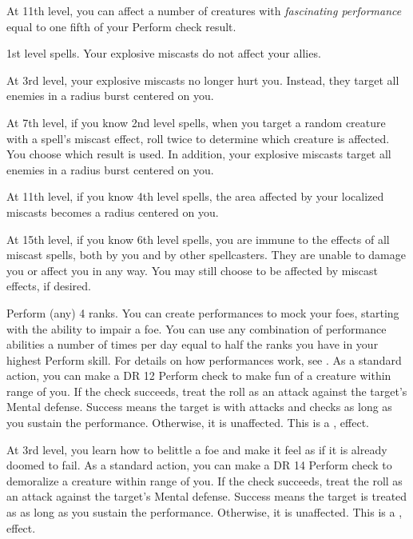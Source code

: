     At 11th level, you can affect a number of creatures with \textit{fascinating performance} equal to one fifth of your Perform check result.

    \featpre 1st level spells.
    \featben Your explosive miscasts do not affect your allies.

    At 3rd level, your explosive miscasts no longer hurt you.
    Instead, they target all enemies in a \areasmall radius burst centered on you.

    At 7th level, if you know 2nd level spells, when you target a random creature with a spell's miscast effect, roll twice to determine which creature is affected.
    You choose which result is used.
    In addition, your explosive miscasts target all enemies in a \areamed radius burst centered on you.

    At 11th level, if you know 4th level spells, the area affected by your localized miscasts becomes a \areamed radius centered on you.

    At 15th level, if you know 6th level spells, you are immune to the effects of all miscast spells, both by you and by other spellcasters.
    They are unable to damage you or affect you in any way.
    You may still choose to be affected by miscast effects, if desired.

    \featpre Perform (any) 4 ranks.
    \featben You can create performances to mock your foes, starting with the ability to impair a foe.
    You can use any combination of performance abilities a number of times per day equal to half the ranks you have in your highest Perform skill.
    For details on how performances work, see .
     As a standard action, you can make a DR 12 Perform check to make fun of a creature within \rngmed range of you.
    If the check succeeds, treat the roll as an attack against the target's Mental defense.
    Success means the target is \impaired with attacks and checks as long as you sustain the performance.
    Otherwise, it is unaffected.
    This is a ,  effect.

    At 3rd level, you learn how to belittle a foe and make it feel as if it is already doomed to fail.
     As a standard action, you can make a DR 14 Perform check to demoralize a creature within \rngmed range of you.
    If the check succeeds, treat the roll as an attack against the target's Mental defense.
    Success means the target is treated as \bloodied as long as you sustain the performance.
    Otherwise, it is unaffected.
    This is a ,  effect.

